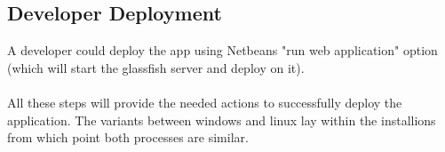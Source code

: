 \documentclass[12pt]{article}
\begin{document}
\subsection{Developer Deployment}
A developer could deploy the app using Netbeans "run web application" option (which will start the glassfish server and deploy on it).\\
\\
All these steps will provide the needed actions to successfully deploy the application. The variants between windows and linux lay within the installions from which point both processes are similar.
\end{document}
